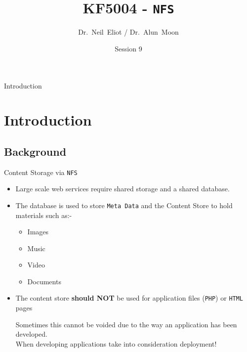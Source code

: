 \documentclass[xcolor=table]{beamer}
\title{KF5004 - \texttt{NFS}}
\author{Dr.~Neil~Eliot\inst{1} / Dr.~Alun~Moon\inst{1}}
\institute[Northumbria University] %
{
  \inst{1}
  Department of Computer and Information Sciences\\
  University of Northumbria
}
\date{Session 9}
\begin{document}
\begin{frame}
  \titlepage
\end{frame}

\begin{frame}{Introduction}
  \tableofcontents
\end{frame}


\section{Introduction}
\subsection{Background}
\begin{frame}{Content Storage via \texttt{NFS}}
  \begin{itemize}
    \item Large scale web services require shared storage and a shared database.
    \item The database is used to store \texttt{Meta Data} and the Content Store to hold materials such as:-    
      \begin{itemize}
        \item Images
        \item Music
        \item Video
        \item Documents
      \end{itemize}
    \item The content store \textbf{should NOT} be used for application files (\texttt{PHP}) or \texttt{HTML} pages
      \begin{tcolorbox}
        \begin{center}
          \scriptsize Sometimes this cannot be voided due to the way an application has been developed. \\When developing applications take into consideration deployment!
        \end{center}
      \end{tcolorbox}
  \end{itemize}
\end{frame}
\end{document}
